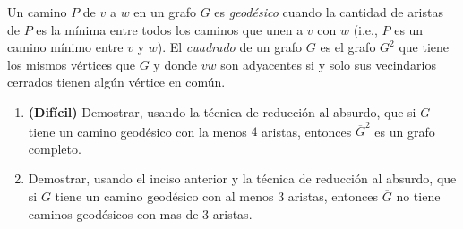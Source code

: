 

\item Un camino $P$ de $v$ a $w$ en un grafo $G$ es \emph{geodésico} cuando la cantidad de aristas de $P$ es la mínima entre todos los caminos que unen a $v$ con $w$ (i.e., $P$ es un camino mínimo entre $v$ y $w$).  El \emph{cuadrado} de un grafo $G$ es el grafo $G^2$ que tiene los mismos vértices que $G$ y donde $vw$ son adyacentes si y solo sus vecindarios cerrados tienen algún vértice en común.
 \begin{enumerate}[label=$\alph*)$,ref=$\alph*)$]
  \item \textbf{(Difícil)} Demostrar, usando la técnica de reducción al absurdo, que si $G$ tiene un camino geodésico con la menos $4$ aristas, entonces $\overline{G}^2$ es un grafo completo.
  \item Demostrar, usando el inciso anterior y la técnica de reducción al absurdo, que si $G$ tiene un camino geodésico con al menos $3$ aristas, entonces $\overline{G}$ no tiene caminos geodésicos con mas de $3$ aristas.
 \end{enumerate}
